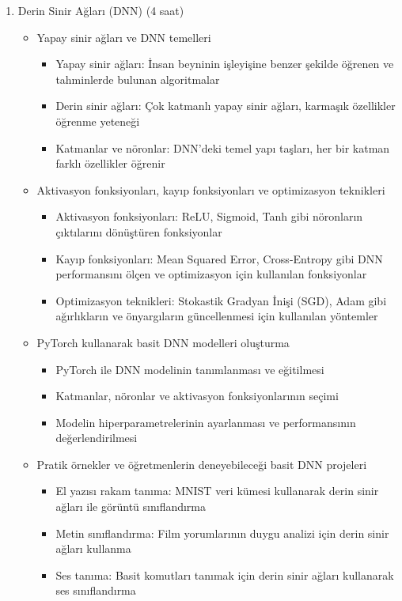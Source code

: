 \documentclass[12pt]{article}
\begin{document}
\begin{enumerate}
    
    \item Derin Sinir Ağları (DNN) (4 saat)
    \begin{itemize}
        \item Yapay sinir ağları ve DNN temelleri
        \begin{itemize}
            \item Yapay sinir ağları: İnsan beyninin işleyişine benzer şekilde öğrenen ve tahminlerde bulunan algoritmalar
            \item Derin sinir ağları: Çok katmanlı yapay sinir ağları, karmaşık özellikler öğrenme yeteneği
            \item Katmanlar ve nöronlar: DNN'deki temel yapı taşları, her bir katman farklı özellikler öğrenir
        \end{itemize}
        \item Aktivasyon fonksiyonları, kayıp fonksiyonları ve optimizasyon teknikleri
        \begin{itemize}
            \item Aktivasyon fonksiyonları: ReLU, Sigmoid, Tanh gibi nöronların çıktılarını dönüştüren fonksiyonlar
            \item Kayıp fonksiyonları: Mean Squared Error, Cross-Entropy gibi DNN performansını ölçen ve optimizasyon için kullanılan fonksiyonlar
            \item Optimizasyon teknikleri: Stokastik Gradyan İnişi (SGD), Adam gibi ağırlıkların ve önyargıların güncellenmesi için kullanılan yöntemler
        \end{itemize}
        \item PyTorch kullanarak basit DNN modelleri oluşturma
        \begin{itemize}
            \item PyTorch ile DNN modelinin tanımlanması ve eğitilmesi
            \item Katmanlar, nöronlar ve aktivasyon fonksiyonlarının seçimi
            \item Modelin hiperparametrelerinin ayarlanması ve performansının değerlendirilmesi
        \end{itemize}
        \item Pratik örnekler ve öğretmenlerin deneyebileceği basit DNN projeleri
        \begin{itemize}
            \item El yazısı rakam tanıma: MNIST veri kümesi kullanarak derin sinir ağları ile görüntü sınıflandırma
            \item Metin sınıflandırma: Film yorumlarının duygu analizi için derin sinir ağları kullanma
            \item Ses tanıma: Basit komutları tanımak için derin sinir ağları kullanarak ses sınıflandırma
        \end{itemize}
    \end{itemize}


\end{enumerate}
\end{document}
